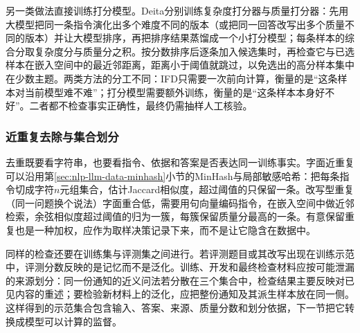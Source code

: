 另一类做法直接训练打分模型。Deita分别训练复杂度打分器与质量打分器：先用大模型把同一条指令演化出多个难度不同的版本（或把同一回答改写出多个质量不同的版本）并让大模型排序，再把排序结果蒸馏成一个小打分模型；每条样本的综合分取复杂度分与质量分之积。按分数排序后逐条加入候选集时，再检查它与已选样本在嵌入空间中的最近邻距离，距离小于阈值就跳过，以免选出的高分样本集中在少数主题。两类方法的分工不同：IFD只需要一次前向计算，衡量的是“这条样本对当前模型难不难”；打分模型需要额外训练，衡量的是“这条样本本身好不好”。二者都不检查事实正确性，最终仍需抽样人工核验。

\subsubsection{近重复去除与集合划分}
\label{sec:nlp-sft-dedup-split}

去重既要看字符串，也要看指令、依据和答案是否表达同一训练事实。字面近重复可以沿用第\ref{sec:nlp-llm-data-minhash}小节的MinHash与局部敏感哈希：把每条指令切成字符$n$元组集合，估计Jaccard相似度，超过阈值的只保留一条。改写型重复（同一问题换个说法）字面重合低，需要用句向量编码指令，在嵌入空间中做近邻检索，余弦相似度超过阈值的归为一簇，每簇保留质量分最高的一条。有意保留重复也是一种加权，应作为取样决策记录下来，而不是让它隐含在数据中。

同样的检查还要在训练集与评测集之间进行。若评测题目或其改写出现在训练示范中，评测分数反映的是记忆而不是泛化。训练、开发和最终检查材料应按可能泄漏的来源划分：同一份通知的近义问法若分散在三个集合中，检查结果主要反映对已见内容的重述；要检验新材料上的泛化，应把整份通知及其派生样本放在同一侧。这样得到的示范集合包含输入、答案、来源、质量分数和划分依据，下一节把它转换成模型可以计算的监督。

